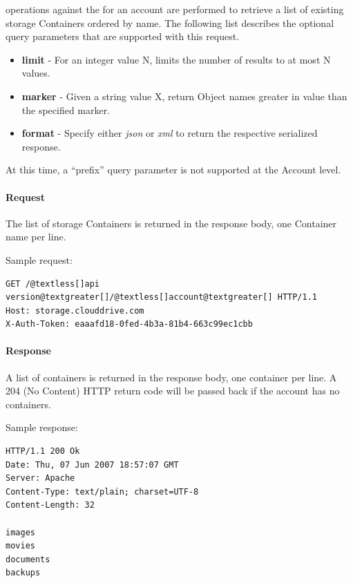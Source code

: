 \documentclass[letterpaper,10pt,english]{manual}
\begin{document}
 operations against the  for an account are
performed to retrieve a list of existing storage Containers ordered by
name.  The following list describes the optional query parameters that
are supported with this request.
\begin{itemize}
\item {} 
\textbf{limit} - For an integer value N, limits the number of results to
at most N values.

\item {} 
\textbf{marker} - Given a string value X, return Object names greater in
value than the specified marker.

\item {} 
\textbf{format} - Specify either \emph{json} or \emph{xml} to return the respective
serialized response.

\end{itemize}

At this time, a “prefix” query parameter is not supported at the Account
level.


\paragraph{Request}

The list of storage Containers is returned in the response body, one
Container name per line.

Sample request:

\begin{Verbatim}[commandchars=@\[\]]
GET /@textless[]api version@textgreater[]/@textless[]account@textgreater[] HTTP/1.1
Host: storage.clouddrive.com
X-Auth-Token: eaaafd18-0fed-4b3a-81b4-663c99ec1cbb
\end{Verbatim}


\paragraph{Response}

A list of containers is returned in the response body, one container per
line. A 204 (No Content) HTTP return code will be passed back if the
account has no containers.

Sample response:

\begin{Verbatim}[commandchars=@\[\]]
HTTP/1.1 200 Ok
Date: Thu, 07 Jun 2007 18:57:07 GMT
Server: Apache
Content-Type: text/plain; charset=UTF-8
Content-Length: 32

images
movies
documents
backups
\end{Verbatim}
\end{document}
